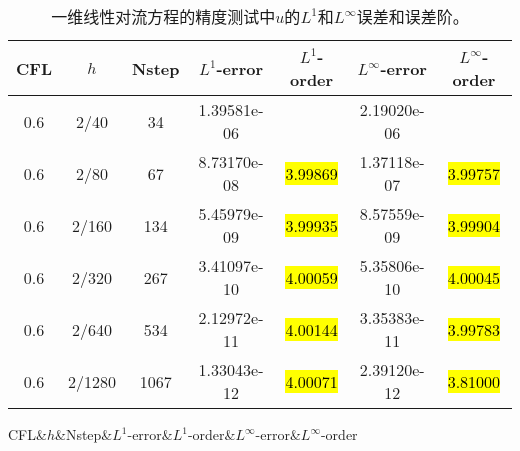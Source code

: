 \def\titleintable{CFL&$h$&Nstep&$L^1$-error&$L^1$-order&$L^\infty$-error&$L^\infty$-order\\}
\begin{table}[htbp]
	\caption{一维线性对流方程的精度测试中$u$的$L^1$和$L^\infty$误差和误差阶。}
	\centering
	\begin{tabular}{ccccccc}
		\toprule
		\titleintable
		\midrule
		0.6 & 2/40   & 34   & 1.39581e-06 &              & 2.19020e-06 &              \\
		0.6 & 2/80   & 67   & 8.73170e-08 & \hl{3.99869} & 1.37118e-07 & \hl{3.99757} \\
		0.6 & 2/160  & 134  & 5.45979e-09 & \hl{3.99935} & 8.57559e-09 & \hl{3.99904} \\
		0.6 & 2/320  & 267  & 3.41097e-10 & \hl{4.00059} & 5.35806e-10 & \hl{4.00045} \\
		0.6 & 2/640  & 534  & 2.12972e-11 & \hl{4.00144} & 3.35383e-11 & \hl{3.99783} \\
		0.6 & 2/1280 & 1067 & 1.33043e-12 & \hl{4.00071} & 2.39120e-12 & \hl{3.81000} \\
		\bottomrule
	\end{tabular}
\end{table}
\undef\titleintable